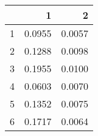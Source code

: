 \begin{table}[ht]
\begin{center}
\begin{tabular}{rrr}
  \hline
 & 1 & 2 \\ 
  \hline
1 & 0.0955 & 0.0057 \\ 
  2 & 0.1288 & 0.0098 \\ 
  3 & 0.1955 & 0.0100 \\ 
  4 & 0.0603 & 0.0070 \\ 
  5 & 0.1352 & 0.0075 \\ 
  6 & 0.1717 & 0.0064 \\ 
   \hline
\end{tabular}
\end{center}
\end{table}
